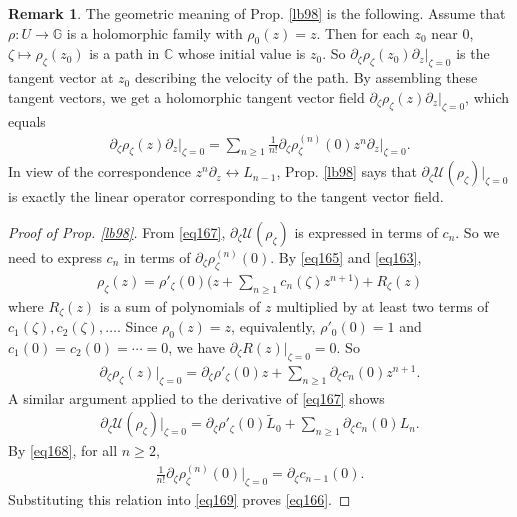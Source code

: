 \documentclass[12pt,a4paper,notitlepage]{article}
\theoremstyle{definition}
\newtheorem{rem}[df]{Remark}
\theoremstyle{plain}
\newcommand{\mc}{\mathcal}
\newcommand{\wtd}{\widetilde}
\newcommand{\Gbb}{\mathbb G}
\newcommand{\Cbb}{\mathbb C}
\numberwithin{equation}{section}
\begin{document}
\begin{rem}\label{lb112}
The geometric meaning of Prop. \ref{lb98} is the following. Assume that $\rho:U\rightarrow\Gbb$ is a holomorphic family with $\rho_0(z)=z$. Then for each $z_0$ near $0$, $\zeta\mapsto \rho_\zeta(z_0)$ is a path in $\Cbb$ whose initial value is $z_0$. So $\partial_\zeta\rho_\zeta(z_0)\partial_z\big|_{\zeta=0}$ is the tangent vector at $z_0$ describing the velocity of the path. By assembling these tangent vectors, we get a holomorphic tangent vector field $\partial_\zeta\rho_\zeta(z)\partial_z\big|_{\zeta=0}$, which equals
\begin{align}
\partial_\zeta\rho_\zeta(z)\partial_z\Big|_{\zeta=0}=\sum_{n\geq 1}\frac 1{n!}\partial_\zeta\rho_\zeta^{(n)}(0)z^n\partial_z\Big|_{\zeta=0}.
\end{align}
In view of the correspondence $z^n\partial_z\leftrightarrow L_{n-1}$, Prop. \ref{lb98} says that $\partial_\zeta\mc U(\rho_\zeta)\big|_{\zeta=0}$ is exactly the linear operator corresponding to the tangent vector field.
\end{rem}




\begin{proof}[Proof of Prop. \ref{lb98}]
From \eqref{eq167}, $\partial_\zeta \mc U(\rho_\zeta)$ is expressed in terms of $c_n$. So we need to express $c_n$ in terms of $\partial_\zeta\rho_\zeta^{(n)}(0)$. By \eqref{eq165} and \eqref{eq163},
\begin{align*}
\rho_\zeta(z)=\rho'_\zeta(0)\Big(z+\sum_{n\geq 1}c_n(\zeta)z^{n+1}\Big)+R_\zeta(z)	
\end{align*}
where $R_\zeta(z)$ is a sum of polynomials of $z$ multiplied by at least two terms of $c_1(\zeta),c_2(\zeta),\dots$. Since $\rho_0(z)=z$, equivalently, $\rho'_0(0)=1$ and $c_1(0)=c_2(0)=\cdots=0$, we have $\partial_\zeta R(z)|_{\zeta=0}=0$. So
\begin{align}
\partial_\zeta\rho_\zeta(z)\Big|_{\zeta=0}=\partial_\zeta\rho'_\zeta(0)z+\sum_{n\geq 1}\partial_\zeta c_n(0) z^{n+1}.\label{eq168}
\end{align}
A similar argument applied to the derivative of \eqref{eq167} shows
\begin{align}
\partial_\zeta\mc U(\rho_\zeta)\Big|_{\zeta=0}=\partial_\zeta\rho'_\zeta(0)\wtd L_0+\sum_{n\geq 1}\partial_\zeta c_n(0)L_n.	\label{eq169}
\end{align}
By \eqref{eq168}, for all $n\geq 2$,
\begin{align*}
\frac 1{n!}\partial_\zeta\rho^{(n)}_\zeta(0)	\Big|_{\zeta=0}=\partial_\zeta c_{n-1}(0).
\end{align*}
Substituting this relation into \eqref{eq169} proves \eqref{eq166}.
\end{proof}
\end{document}
